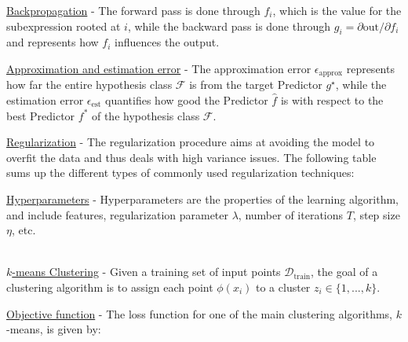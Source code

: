 \documentclass[4pt,landscape]{article}
\begin{document}
\begin{multicols*}{4}
{\underline{Backpropagation} - The forward pass is done through $f_i$, which is the value for the subexpression rooted at $i$, while the backward pass is done through \tiny $ g_i={\partial\textrm{out}} / {\partial f_i}$ and represents how $f_i$ influences the output.}\par

{\underline{Approximation and estimation error} - The approximation error $\epsilon_\text{approx}$ represents how far the entire hypothesis class \tiny $\mathcal{F}$ is from the target Predictor $g^\star$, while the estimation error $\epsilon_{\text{est}}$ quantifies how good the Predictor $\hat{f}$ is with respect to the best Predictor $f^{*}$ of the hypothesis class $\mathcal{F}$.}\par

{\underline{Regularization} - The regularization procedure aims at avoiding the model to overfit the data and thus deals with high variance issues. The following table sums up the different types of commonly used regularization techniques:}\par


{\underline{Hyperparameters} - Hyperparameters are the properties of the learning algorithm, and include features, regularization parameter $\lambda$, number of iterations $T$, step size $\eta$, etc.}\par

{\color{black}\hrulefill}\\
{\tiny \underline{$k$-means Clustering} - Given a training set of input points $\mathcal{D}_{\textrm{train}}$, the goal of a clustering algorithm is to assign each point $\phi(x_i)$ to a cluster $z_i\in\{1,...,k\}$.}\par

{\tiny \underline{Objective function} - The loss function for one of the main clustering algorithms, $k$-means, is given by:}\par


\end{multicols*}
\end{document}
